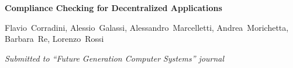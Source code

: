     \abitspace
        
    \begin{onecolentry}
        \textbf{Compliance Checking for Decentralized Applications}
        
        \mbox{Flavio Corradini}, \mbox{Alessio Galassi}, \mbox{Alessandro Marcelletti}, \mbox{Andrea Morichetta}, \mbox{Barbara Re}, \mbox{Lorenzo Rossi}

        \textit{Submitted to ``Future Generation Computer Systems'' journal}
    \end{onecolentry}
    
    
        

   
    